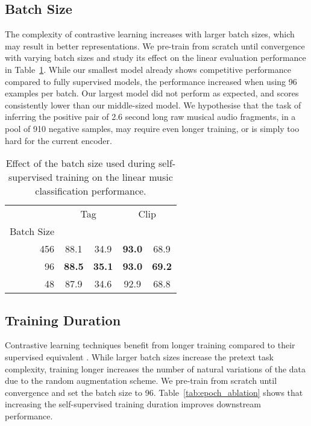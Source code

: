 \documentclass{article}
\begin{document}
\subsection{Batch Size}\label{sec:exp_mini_batch_size}
The complexity of contrastive learning increases with larger batch sizes, which may result in better representations.
We pre-train from scratch until convergence with varying batch sizes and study its effect on the linear evaluation performance in Table~\ref{tab:mini_batch_ablation}.
While our smallest model already shows competitive performance compared to fully supervised models, the performance increased when using 96 examples per batch.
Our largest model did not perform as expected, and scores consistently lower than our middle-sized model.
We hypothesise that the task of inferring the positive pair of 2.6 second long raw musical audio fragments, in a pool of 910 negative samples, may require even longer training, or is simply too hard for the current encoder.

\begin{table}[t]
\centering
    \footnotesize
    \begin{tabular}{rcccc}
    \toprule
    &\multicolumn{2}{c}{Tag} &\multicolumn{2}{c}{Clip}\\
    \cmidrule(lr){2-3} \cmidrule(lr){4-5}
    Batch Size &  &  &  &   \\
    \midrule
    456 & 88.1 & 34.9 & \textbf{93.0} & 68.9 \\
    96 & \textbf{88.5} & \textbf{35.1} & \textbf{93.0} & \textbf{69.2} \\
    48 & 87.9 & 34.6 & 92.9 & 68.8 \\
    \bottomrule
    \end{tabular}
    \caption{Effect of the batch size used during self-supervised training on the linear music classification performance.}
    \label{tab:mini_batch_ablation}
\end{table}


\subsection{Training Duration}
\label{sec:epoch_experiments}
Contrastive learning techniques benefit from longer training compared to their supervised equivalent \cite{chen_simple_2020}.
While larger batch sizes increase the pretext task complexity, training longer increases the number of natural variations of the data due to the random augmentation scheme.
We pre-train from scratch until convergence and set the batch size to 96.
Table~\ref{tab:epoch_ablation} shows that increasing the self-supervised training duration improves downstream performance.
\end{document}
